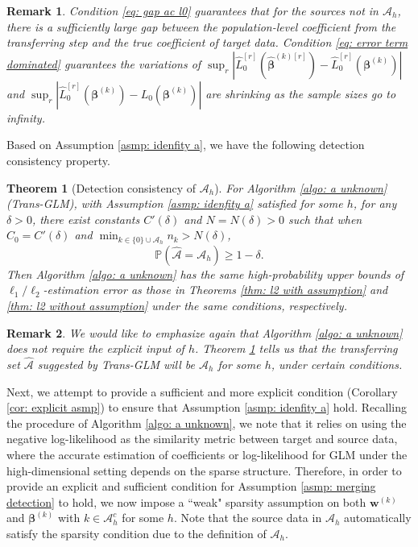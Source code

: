 \documentclass[12pt]{article}
\newcommand{\tp}{\mathbb{P}}
\newcommand{\norm}[1]{|#1|}
\newcommand{\hbeta}{\hat{\bm{\beta}}}
\newcommand{\bbetak}[1]{\bm{\beta}^{(#1)}}
\newcommand{\bwk}[1]{\bm{w}^{(#1)}}
\newcommand{\ma}{\mathcal{A}}
\newcommand{\mah}{\mathcal{A}_h}
\newcommand{\mach}{\mathcal{A}^c_h}
\newcommand{\transet}{\{0\}\cup \mah}
\newcommand{\<}{\langle}
\renewcommand{\>}{\rangle}
\newtheorem{theorem}{Theorem}
\newtheorem{remark}{Remark}
\begin{document}
\begin{remark}
	Condition \eqref{eq: gap ac l0} guarantees that for the sources not in $\mah$, there is a sufficiently large gap between the population-level coefficient from the transferring step and the true coefficient of target data. Condition \eqref{eq: error term dominated} guarantees the variations of $\sup_r\norm{\hat{L}_0^{[r]}(\hbeta^{(k)[r]}) - \hat{L}_0^{[r]}(\bbetak{k})}$ and $\sup_r\norm{\hat{L}_0^{[r]}(\bbetak{k}) -L_0(\bbetak{k})}$ are shrinking as the sample sizes go to infinity.
\end{remark}

Based on Assumption \ref{asmp: idenfity a}, we have the following detection consistency property.
\begin{theorem}[Detection consistency of $\mah$]\label{thm: a detection}
	For Algorithm \ref{algo: a unknown} (Trans-GLM), with Assumption \ref{asmp: idenfity a} satisfied for some $h$, for any $\delta > 0$, there exist constants $C'(\delta)$ and $N = N(\delta) > 0$ such that when $C_0 = C'(\delta)$ and $\min_{k \in \transet} n_k > N(\delta)$,
	\begin{equation}
		\tp(\widehat{\mathcal{A}} = \mathcal{A}_h) \geq 1-\delta.
	\end{equation}
	Then Algorithm \ref{algo: a unknown} has the same high-probability upper bounds of $\ell_1/\ell_2$-estimation error as those in Theorems \ref{thm: l2 with assumption} and \ref{thm: l2 without assumption} under the same conditions, respectively. 
\end{theorem}

\begin{remark}
	We would like to emphasize again that Algorithm \ref{algo: a unknown} does not require the explicit input of $h$. Theorem \ref{thm: a detection} tells us that the transferring set $\widehat{\ma}$ suggested by Trans-GLM will be $\mah$ for some $h$, under certain conditions.
\end{remark}

Next, we attempt to provide a sufficient and more explicit condition (Corollary \ref{cor: explicit asmp}) to ensure that Assumption \ref{asmp: idenfity a} hold. Recalling the procedure of Algorithm \ref{algo: a unknown}, we note that it relies on using the negative log-likelihood as the similarity metric between target and source data, where the accurate estimation of coefficients or log-likelihood for GLM under the high-dimensional setting depends on the sparse structure. Therefore, in order to provide an explicit and sufficient condition for Assumption \ref{asmp: merging detection} to hold, we now impose a ``weak" sparsity assumption on both $\bwk{k}$ and $\bbetak{k}$ with $k \in \mach$ for some $h$. Note that the source data in $\mah$ automatically satisfy the sparsity condition due to the definition of $\mah$.
\end{document}
